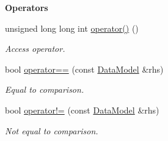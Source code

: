 \begin{Indent}{\bf Operators}\par
\begin{DoxyCompactItemize}
\item 
unsigned long long int \hyperlink{exceptionmagrathea_1_1DataModel_a241087e5a976e940b1a9ae44c5129e02}{operator()} ()
\begin{DoxyCompactList}\small\item\em Access operator. \end{DoxyCompactList}\item 
bool \hyperlink{exceptionmagrathea_1_1DataModel_a4500d9d456de747c4647a58059587e15}{operator==} (const \hyperlink{exceptionmagrathea_1_1DataModel}{Data\-Model} \&rhs)
\begin{DoxyCompactList}\small\item\em Equal to comparison. \end{DoxyCompactList}\item 
bool \hyperlink{exceptionmagrathea_1_1DataModel_ab08bda2cc90b157d37b8e8e862d53d3a}{operator!=} (const \hyperlink{exceptionmagrathea_1_1DataModel}{Data\-Model} \&rhs)
\begin{DoxyCompactList}\small\item\em Not equal to comparison. \end{DoxyCompactList}\end{DoxyCompactItemize}
\end{Indent}
